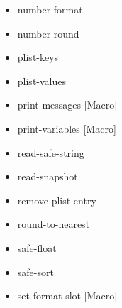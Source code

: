 \documentclass [11pt]{book}
\begin{document}
\begin{itemize}
\item {}number-format





\item {}number-round





\item {}plist-keys





\item {}plist-values





\item {}print-messages [Macro]





\item {}print-variables [Macro]





\item {}read-safe-string





\item {}read-snapshot





\item {}remove-plist-entry





\item {}round-to-nearest





\item {}safe-float





\item {}safe-sort





\item {}set-format-slot [Macro]






\end{itemize}
\end{document}
